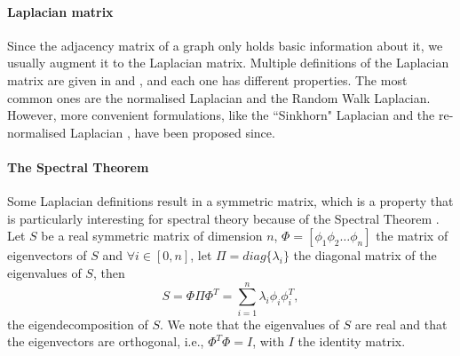 \paragraph{Laplacian matrix}
Since the adjacency matrix of a graph only holds basic information about it, we usually augment it to the Laplacian matrix.
Multiple definitions of the Laplacian matrix are given in \cite{chung_spectral_1997} and \cite{siam_slides_2016}, and each one has different properties.
The most common ones are the normalised Laplacian and the Random Walk Laplacian.
However, more convenient formulations, like the ``Sinkhorn" Laplacian \cite{milanfar_symmetrizing_2013} and the re-normalised Laplacian \cite{siam_slides_2016} \cite{milanfar_new_2016}, have been proposed since.

\paragraph{The Spectral Theorem}
Some Laplacian definitions result in a symmetric matrix, which is a property that is particularly interesting for spectral theory because of the Spectral Theorem \cite{zhang_spectral_2010}.
Let \(S\) be a real symmetric matrix of dimension \(n\), \(\Phi = [\phi_1 \phi_2 \dots \phi_n ]\) the matrix of eigenvectors of \(S\) and \(\forall i \in [0,n]\), let \(\Pi = diag\{\lambda_i\}\) the diagonal matrix of the eigenvalues of \(S\), then
\[S = \Phi \Pi \Phi^T = \sum_{i=1}^n \lambda_i \phi_i \phi_i^T,\]
the eigendecomposition of \(S\).
We note that the eigenvalues of \(S\) are real and that the eigenvectors are orthogonal, i.e., \(\Phi^T\Phi = I\), with \(I\) the identity matrix.

%
%
%

